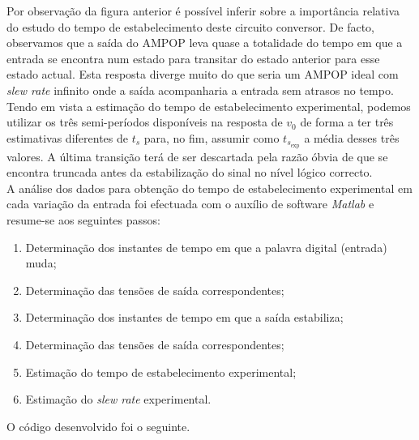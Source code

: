\documentclass[a4paper,11pt]{report}
\begin{document}
Por observação da figura anterior é possível inferir sobre a importância relativa do estudo do tempo de estabelecimento deste circuito conversor. De facto, observamos que a saída do AMPOP leva quase a totalidade do tempo em que a entrada se encontra num estado para transitar do estado anterior para esse estado actual. Esta resposta diverge muito do que seria um AMPOP ideal com \emph{slew rate} infinito onde a saída acompanharia a entrada sem atrasos no tempo.\\

Tendo em vista a estimação do tempo de estabelecimento experimental, podemos utilizar os três semi-períodos disponíveis na resposta de $v_0$ de forma a ter três estimativas diferentes de $t_s$ para, no fim, assumir como $t_{s_{\textrm{exp}}}$ a média desses três valores. A última transição terá de ser descartada pela razão óbvia de que se encontra truncada antes da estabilização do sinal no nível lógico correcto.\\

A análise dos dados para obtenção do tempo de estabelecimento experimental em cada variação da entrada foi efectuada com o auxílio de software \textit{Matlab} e resume-se aos seguintes passos:
\begin{enumerate}
\item Determinação dos instantes de tempo em que a palavra digital (entrada) muda;
\item Determinação das tensões de saída correspondentes;
\item Determinação dos instantes de tempo em que a saída estabiliza;
\item Determinação das tensões de saída correspondentes;
\item Estimação do tempo de estabelecimento experimental;
\item Estimação do \emph{slew rate} experimental.
\end{enumerate}

O código desenvolvido foi o seguinte.\\

\begin{framed}

\end{framed}
\end{document}
